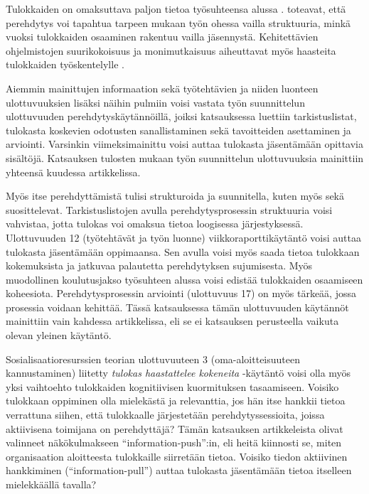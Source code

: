 \documentclass[utf8]{gradu3}
\begin{document}
Tulokkaiden on omaksuttava paljon tietoa työsuhteensa alussa \parencite{dagenais-ym-2010}. \textcite{begel-simon-2008} toteavat, että perehdytys voi tapahtua tarpeen mukaan työn ohessa vailla struktuuria, minkä vuoksi tulokkaiden osaaminen rakentuu vailla jäsennystä. Kehitettävien ohjelmistojen suurikokoisuus ja monimutkaisuus aiheuttavat myös haasteita tulokkaiden työskentelylle %
\parencites%
    {craig-ym-2018}%
    {britto-ym-2019}%
\relax
% 
.

Aiemmin mainittujen informaation sekä työtehtävien ja niiden luonteen ulottuvuuksien lisäksi näihin pulmiin voisi vastata työn suunnittelun ulottuvuuden perehdytyskäytännöillä, joiksi katsauksessa luettiin tarkistuslistat, tulokasta koskevien odotusten sanallistaminen sekä tavoitteiden asettaminen ja arviointi. Varsinkin viimeksimainittu voisi auttaa tulokasta jäsentämään opittavia sisältöjä. Katsauksen tulosten mukaan työn suunnittelun ulottuvuuksia mainittiin yhteensä kuudessa artikkelissa.

Myös itse perehdyttämistä tulisi strukturoida ja suunnitella, kuten myös \textcite{britto-ym-2020} sekä \textcite{hemphill-begel-2011} suosittelevat. Tarkistuslistojen avulla perehdytysprosessin struktuuria voisi vahvistaa, jotta tulokas voi omaksua tietoa loogisessa järjestyksessä. Ulottuvuuden 12 (työtehtävät ja työn luonne) viikkoraporttikäytäntö voisi auttaa tulokasta jäsentämään oppimaansa. Sen avulla voisi myös saada tietoa tulokkaan kokemuksista ja jatkuvaa palautetta perehdytyksen sujumisesta. Myös muodollinen koulutusjakso työsuhteen alussa voisi edistää tulokkaiden osaamiseen koheesiota. Perehdytysprosessin arviointi (ulottuvuus 17) on myös tärkeää, jossa prosessia voidaan kehittää. Tässä katsauksessa tämän ulottuvuuden käytännöt mainittiin vain kahdessa artikkelissa, eli se ei katsauksen perusteella vaikuta olevan yleinen käytäntö.

Sosialisaatioresurssien teorian ulottuvuuteen 3 (oma-aloitteisuuteen kannustaminen) liitetty \textit{tulokas haastattelee kokeneita} -käytäntö voisi olla myös yksi vaihtoehto tulokkaiden kognitiivisen kuormituksen tasaamiseen. Voisiko tulokkaan oppiminen olla mielekästä ja relevanttia, jos hän itse hankkii tietoa verrattuna siihen, että tulokkaalle järjestetään perehdytyssessioita, joissa aktiivisena toimijana on perehdyttäjä? Tämän katsauksen artikkeleista \textcite{yates-ym-2020} olivat valinneet näkökulmakseen ``information-push'':in, eli heitä kiinnosti se, miten organisaation aloitteesta tulokkaille siirretään tietoa. Voisiko tiedon aktiivinen hankkiminen (``information-pull'') auttaa tulokasta jäsentämään tietoa itselleen mielekkäällä tavalla?
\end{document}
